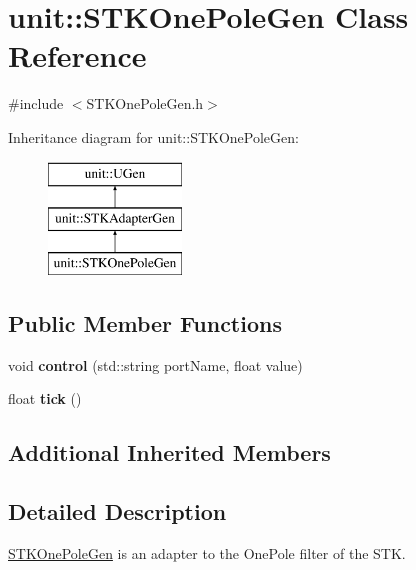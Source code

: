 \hypertarget{classunit_1_1STKOnePoleGen}{}\section{unit\+:\+:S\+T\+K\+One\+Pole\+Gen Class Reference}
\label{classunit_1_1STKOnePoleGen}


{\ttfamily \#include $<$S\+T\+K\+One\+Pole\+Gen.\+h$>$}

Inheritance diagram for unit\+:\+:S\+T\+K\+One\+Pole\+Gen\+:\begin{figure}[H]
\begin{center}
\leavevmode
\includegraphics[height=3.000000cm]{classunit_1_1STKOnePoleGen}
\end{center}
\end{figure}
\subsection*{Public Member Functions}
\begin{DoxyCompactItemize}
\item 
void {\bfseries control} (std\+::string port\+Name, float value)\hypertarget{classunit_1_1STKOnePoleGen_abafc7a64770438cbde61518a7cf2d94b}{}\label{classunit_1_1STKOnePoleGen_abafc7a64770438cbde61518a7cf2d94b}

\item 
float {\bfseries tick} ()\hypertarget{classunit_1_1STKOnePoleGen_a3bc702fbc334d94eebd409755d1d74e8}{}\label{classunit_1_1STKOnePoleGen_a3bc702fbc334d94eebd409755d1d74e8}

\end{DoxyCompactItemize}
\subsection*{Additional Inherited Members}


\subsection{Detailed Description}
\hyperlink{classunit_1_1STKOnePoleGen}{S\+T\+K\+One\+Pole\+Gen} is an adapter to the One\+Pole filter of the S\+TK.

